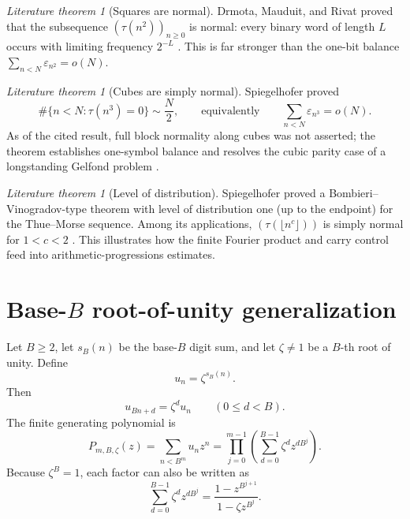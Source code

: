 \documentclass[11pt,oneside]{article}
\numberwithin{equation}{section}
\theoremstyle{definition}
\theoremstyle{remark}
\newtheorem{literature}[theorem]{Literature theorem}
\newcommand{\eps}{\varepsilon}
\newcommand{\TM}{\tau}
\newcommand{\smallo}{o}
\begin{document}
\begin{literature}[Squares are normal]
Drmota, Mauduit, and Rivat proved that the subsequence
\((\TM(n^2))_{n\ge0}\) is normal: every binary word of length \(L\) occurs
with limiting frequency \(2^{-L}\) \cite{DrmotaMauduitRivatSquares}.  This is
far stronger than the one-bit balance
\(\sum_{n<N}\eps_{n^2}=\smallo(N)\).
\end{literature}

\begin{literature}[Cubes are simply normal]
Spiegelhofer proved
\begin{equation}
 \#\{n<N:\TM(n^3)=0\}\sim\frac N2,
 \qquad\text{equivalently}\qquad
 \sum_{n<N}\eps_{n^3}=\smallo(N).
 \label{eq:cubes-balance}
\end{equation}
As of the cited result, full block normality along cubes was not asserted;
the theorem establishes one-symbol balance and resolves the cubic parity case
of a longstanding Gelfond problem \cite{SpiegelhoferCubes}.
\end{literature}

\begin{literature}[Level of distribution]
Spiegelhofer proved a Bombieri--Vinogradov-type theorem with level of
distribution one (up to the endpoint) for the Thue--Morse sequence.  Among its
applications, \((\TM(\lfloor n^c\rfloor))\) is simply normal for
\(1<c<2\) \cite{SpiegelhoferLevel}.  This illustrates how the finite Fourier
product and carry control feed into arithmetic-progressions estimates.
\end{literature}

\section{Base-\texorpdfstring{\(B\)}{B} root-of-unity generalization}
\label{sec:baseB}

Let \(B\ge2\), let \(s_B(n)\) be the base-\(B\) digit sum, and let
\(\zeta\ne1\) be a \(B\)-th root of unity.  Define
\begin{equation}
 u_n=\zeta^{s_B(n)}.
 \label{eq:baseB-sequence}
\end{equation}
Then
\begin{equation}
 u_{Bn+d}=\zeta^d u_n\qquad(0\le d<B).
 \label{eq:baseB-recursion}
\end{equation}
The finite generating polynomial is
\begin{equation}
 \boxed{P_{m,B,\zeta}(z)=\sum_{n<B^m}u_nz^n
 =\prod_{j=0}^{m-1}\left(\sum_{d=0}^{B-1}
 \zeta^dz^{dB^j}\right).}
 \label{eq:baseB-product}
\end{equation}
Because \(\zeta^B=1\), each factor can also be written as
\begin{equation}
 \sum_{d=0}^{B-1}\zeta^dz^{dB^j}
 =\frac{1-z^{B^{j+1}}}{1-\zeta z^{B^j}}.
 \label{eq:baseB-rational-factor}
\end{equation}
\end{document}
